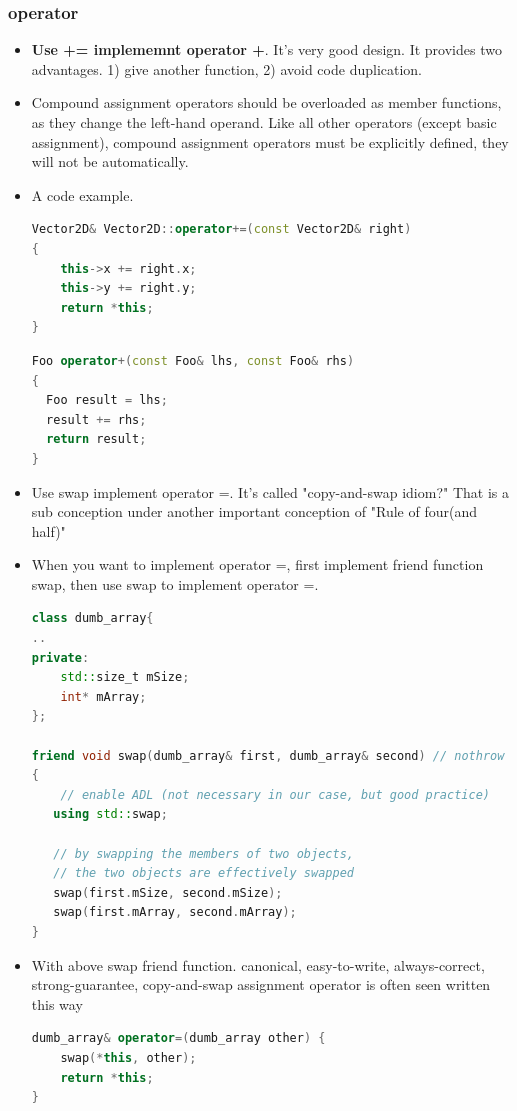 \documentclass[a4paper,12pt,twoside]{book}
\begin{document}
\subsubsection{operator}
\begin{itemize}
\item \textbf{Use += implememnt operator +}. It's very good design. It provides two advantages. 1) give another function, 2) avoid code duplication. 

\item Compound assignment operators should be overloaded as member functions, as they change the left-hand operand. Like all other operators (except basic assignment), compound assignment operators must be explicitly defined, they will not be automatically.

\item A code example. 
\begin{lstlisting}[frame=single, language=c++, mathescape=true]
Vector2D& Vector2D::operator+=(const Vector2D& right)
{
    this->x += right.x;
    this->y += right.y;
    return *this;
}
\end{lstlisting}

\begin{lstlisting}[frame=single, language=c++, mathescape=true]
Foo operator+(const Foo& lhs, const Foo& rhs)
{
  Foo result = lhs;
  result += rhs;
  return result;
}
\end{lstlisting}

\item Use swap implement operator =. It's called "copy-and-swap idiom?" That is a sub conception under another important conception of "Rule of four(and half)"


\item When you want to implement operator =, first implement friend function swap, then use swap to implement operator =.
\begin{lstlisting}[frame=single, language=c++, mathescape=true]
class dumb_array{
..
private:
    std::size_t mSize;
    int* mArray;
};

friend void swap(dumb_array& first, dumb_array& second) // nothrow
{
    // enable ADL (not necessary in our case, but good practice)
   using std::swap;

   // by swapping the members of two objects,
   // the two objects are effectively swapped
   swap(first.mSize, second.mSize);
   swap(first.mArray, second.mArray);
}

\end{lstlisting}

\item With above swap friend function. canonical, easy-to-write, always-correct, strong-guarantee, copy-and-swap assignment operator is often seen written this way
\begin{lstlisting}[frame=single, language=c++, mathescape=true]
dumb_array& operator=(dumb_array other) {
    swap(*this, other);
    return *this;
}
\end{lstlisting}

\end{itemize}
\end{document}

